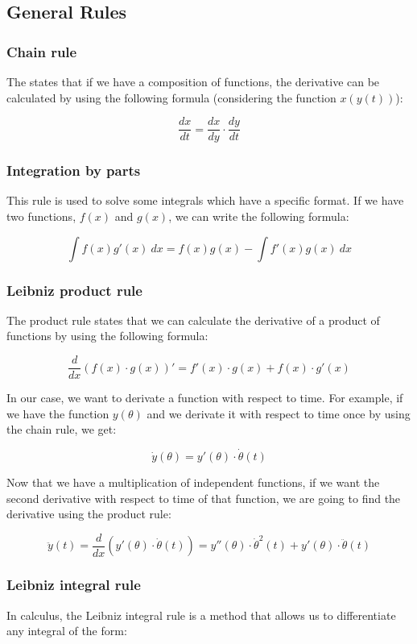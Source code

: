 \documentclass[12pt,twoside,a4paper]{article}
\begin{document}
	\newpage
	
	\subsection{General Rules}
	\subsubsection*{Chain rule}
	The states that if we have a composition of functions, the derivative can be calculated by using the following formula (considering the function $x(y(t))$):
	
	$$\frac{dx}{dt} = \frac{dx}{dy} \cdot \frac{dy}{dt}$$
	
	\subsubsection*{Integration by parts}
	This rule is used to solve some integrals which have a specific format. If we have two functions, $f(x)$ and $g(x)$, we can write the following formula:
	
	$$\int f(x)g'(x)\ dx = f(x)g(x) - \int f'(x)g(x)\ dx$$
	
	\subsubsection*{Leibniz product rule}
	The product rule states that we can calculate the derivative of a product of functions by using the following formula:
	
	$$\frac{d}{dx}(f(x) \cdot g(x))' = f'(x) \cdot g(x) + f(x) \cdot g'(x)$$
	
	In our case, we want to derivate a function with respect to time. For example, if we have the function $y(\theta)$ and we derivate it with respect to time once by using the chain rule, we get:
	
	$$\dot{y}(\theta) = y'(\theta) \cdot \dot{\theta}(t)$$
	
	Now that we have a multiplication of independent functions, if we want the second derivative with respect to time of that function, we are going to find the derivative using the product rule:
	
	$$\ddot{y}(t) = \frac{d}{dx}\left(y'(\theta) \cdot \dot{\theta}(t)\right) = y''(\theta) \cdot \dot{\theta}^2(t) + y'(\theta) \cdot \ddot{\theta}(t)$$
	
	\subsubsection*{Leibniz integral rule}
	In calculus, the Leibniz integral rule is a method that allows us to differentiate any integral of the form:
	
\end{document}
